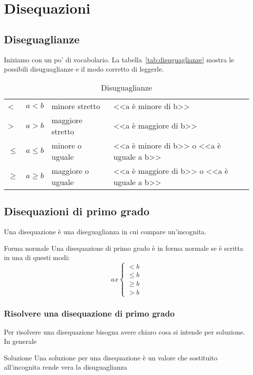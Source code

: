\chapter{Disequazioni}
 \section{Diseguaglianze}
\label{sec:Disequglianze}
Iniziamo con un po' di vocabolario. La tabella~\vref{tab:disuguaglianze} mostra le possibili disuguaglianze e il modo corretto di  leggerle.
\begin{table}
	\centering
	\begin{tabular}{lcll}
		\toprule
		<&$a<b$&minore stretto&<<a è minore di b>>\\
		>&$a>b$&maggiore stretto& <<a è maggiore di b>>\\
		$\leq$&$a\leq b$&minore o uguale& <<a è minore di b>> o <<a è uguale a b>> \\
		$\geq$&$a\geq b$&maggiore o uguale&<<a è maggiore di b>> o <<a è uguale a b>>\\
		\bottomrule
	\end{tabular}
	\caption{Disuguaglianze}
	\label{tab:disuguaglianze}
\end{table}

\section{Disequazioni di primo grado}
\label{sec:Disequazionidiprimogrado}
\begin{definizionet}{}{}
	Una disequazione è una diseguaglianza in cui compare un'incognita.
\end{definizionet}
\begin{definizionet}{Forma normale}{}
	Una disequazione di primo grado è in forma normale se è scritta in una di questi modi:
	\begin{equation}
	ax\left\{ \begin{aligned}
	<b\\
	\leq b\\
	\geq b\\
	>b
	\end{aligned}\right .   
	\end{equation}
\end{definizionet}
\subsection{Risolvere una disequazione di primo grado}
Per risolvere una disequazione bisogna avere chiaro cosa si intende per soluzione. In generale
\begin{definizionet}{Soluzione}{}
	Una soluzione per una disequazione è un valore che sostituito all'incognita rende vera la disuguaglianza
\end{definizionet}


